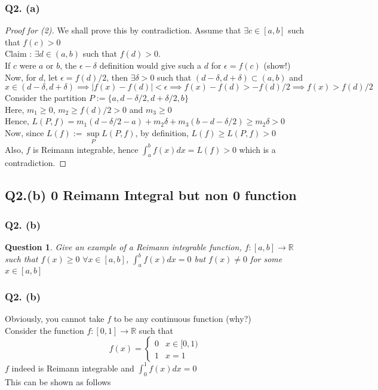 \documentclass[handout,aspectratio=169]{beamer}
\newtheorem{qsn}{Question}
\newcommand{\bR}{\mathbb{R}}
\begin{document}
\begin{frame}
\frametitle{Q2. (a)}
\begin{proof}[Proof for (2)]
\pause
We shall prove this by contradiction. Assume that $\exists c\in [a,b]$ such that $f(c)>0$\\ \pause
Claim : $\exists d\in(a,b)$ such that $f(d)>0$. \\ \pause
If $c$ were $a$ or $b$, the $\epsilon-\delta$ definition would give such a $d$ for $\epsilon = f(c)$ (show!) \\ \pause
Now, for $d$, let $\epsilon = f(d)/2$, then $\exists \delta>0$ such that $(d-\delta,d+\delta)\subset (a,b)$ and $x\in(d-\delta,d+\delta) \implies |f(x)-f(d)|<\epsilon \implies f(x)-f(d)>-f(d)/2 \implies f(x)>f(d)/2$ \\ \pause
Consider the partition $P:=\{a,d-\delta/2,d+\delta/2,b\}$ \\ \pause
Here, $m_1\geqslant 0$, $m_2\geqslant f(d)/2>0$ and $m_3 \geqslant 0$ \\ \pause
Hence, $L(P,f) = m_1(d-\delta/2-a)+m_2\delta + m_3(b-d-\delta/2) \geqslant m_2\delta>0$ \\ \pause
Now, since $L(f) := \sup\limits_{P} L(P,f)$, by definition, $L(f)\geqslant L(P,f)>0$ \\ \pause
Also, $f$ is Reimann integrable, hence $\int_a^b f(x)dx = L(f) > 0$ which is a contradiction.
\end{proof}
\end{frame}

\subsection{Q2.(b) 0 Reimann Integral but non 0 function}

\begin{frame}
\frametitle{Q2. (b)}
\pause
\begin{qsn}
Give an example of a Reimann integrable function, $f:[a,b]\to\bR$ such that $f(x)\geqslant 0\,\, \forall x\in [a,b]$, $\int_a^b f(x)dx = 0$ but $f(x)\neq 0$ for some $x \in [a,b]$
\end{qsn}
\end{frame}

\begin{frame}
\frametitle{Q2. (b)}
\pause
Obviously, you cannot take $f$ to be any continuous function (why?) \\[1mm] \pause
Consider the function $f:[0,1]\to\bR$ such that
$$f(x) = 
\begin{cases}
0 & x\in [0,1)\\
1 & x=1
\end{cases}
$$\pause
$f$ indeed is Reimann integrable and $\int_0^1 f(x)dx=0$\\ \pause
This can be shown as follows
\end{frame}
\end{document}
